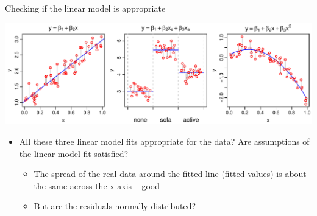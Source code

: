 \documentclass[xcolor=x11names,compress]{beamer}
\renewcommand{\(}{\begin{columns}}
\renewcommand{\)}{\end{columns}}
\newcommand{\<}[1]{\begin{column}{#1}}
\renewcommand{\>}{\end{column}}
\begin{document}

\begin{frame}{Checking if the linear model is appropriate}

\includegraphics[width=\textwidth]{ConstantVarianceMods.pdf}

\begin{itemize}[<+->]
\item All these three linear model fits appropriate for the data? Are assumptions of the linear model fit satisfied?
\pause
\begin{itemize}[<+->]\itemsep6pt
    \item The spread of the real data around the fitted line (fitted values) is about the same across the x-axis -- good
    \item But are the residuals normally distributed?
\end{itemize}
\end{itemize}

\end{frame}

\end{document}
